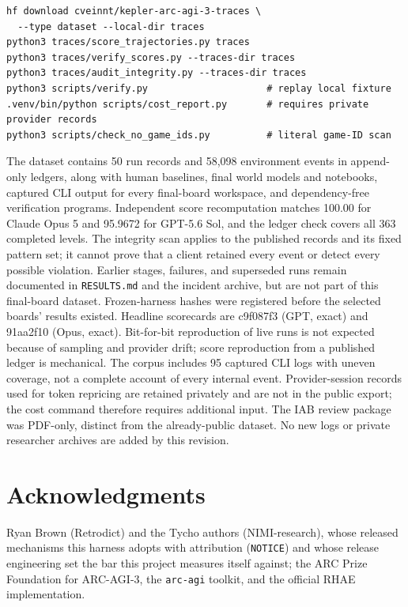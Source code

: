 \documentclass[11pt]{article}
\begin{document}
{\footnotesize\begin{verbatim}
hf download cveinnt/kepler-arc-agi-3-traces \
  --type dataset --local-dir traces
python3 traces/score_trajectories.py traces
python3 traces/verify_scores.py --traces-dir traces
python3 traces/audit_integrity.py --traces-dir traces
python3 scripts/verify.py                     # replay local fixture
.venv/bin/python scripts/cost_report.py       # requires private provider records
python3 scripts/check_no_game_ids.py          # literal game-ID scan
\end{verbatim}}

The dataset contains 50 run records and 58,098 environment events in append-only ledgers, along with human baselines, final world models and notebooks, captured CLI output for every final-board workspace, and dependency-free verification programs. Independent score recomputation matches 100.00 for Claude Opus 5 and 95.9672 for GPT-5.6 Sol, and the ledger check covers all 363 completed levels. The integrity scan applies to the published records and its fixed pattern set; it cannot prove that a client retained every event or detect every possible violation. Earlier stages, failures, and superseded runs remain documented in \texttt{RESULTS.md} and the incident archive, but are not part of this final-board dataset. Frozen-harness hashes were registered before the selected boards' results existed. Headline scorecards are c9f087f3 (GPT, exact) and 91aa2f10 (Opus, exact). Bit-for-bit reproduction of live runs is not expected because of sampling and provider drift; score reproduction from a published ledger is mechanical. The corpus includes 95 captured CLI logs with uneven coverage, not a complete account of every internal event. Provider-session records used for token repricing are retained privately and are not in the public export; the cost command therefore requires additional input. The IAB review package was PDF-only, distinct from the already-public dataset. No new logs or private researcher archives are added by this revision.

\section*{Acknowledgments}

Ryan Brown (Retrodict) and the Tycho authors (NIMI-research), whose released mechanisms this harness adopts with attribution (\texttt{NOTICE}) and whose release engineering set the bar this project measures itself against; the ARC Prize Foundation for ARC-AGI-3, the \texttt{arc-agi} toolkit, and the official RHAE implementation.
\end{document}
